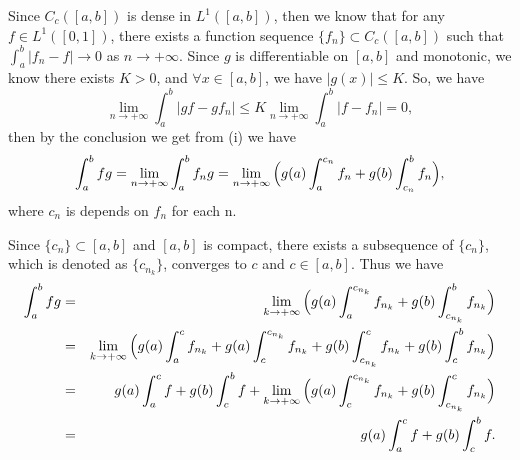 \documentclass[12pt,a4paper]{ctexart}
\begin{document}
Since $C_{c}([a, b])$ is dense in $L^{1}([a, b])$, then we know that for any $f \in L^{1}([0, 1])$, there exists a function sequence $\{f_{n}\} \subset C_{c}([a, b])$ such that $\int_{a}^{b} |f_{n} - f| \to 0$ as $n \to + \infty$.
Since $g$ is differentiable on $[a,b]$ and monotonic, we know there exists $K > 0$, and $\forall x \in [a, b]$, we have $|g(x)| \leq K$. So, we have
\begin{equation*}
   \lim_{n \to + \infty} \int_{a}^{b} |g f - g f_{n}| \leq K \lim_{n \to + \infty} \int_{a}^{b}|f - f_{n}| = 0,
\end{equation*}
then by the conclusion we get from (i) we have
\begin{equation*}
   \int_{a}^{b} f g = \lim_{n \to + \infty} \int_{a}^{b} f_{n} g = \lim_{n \to + \infty} \Big{(} g(a) \int_{a}^{c_{n}} f_{n} + g(b) \int_{c_{n}}^{b} f_{n} \Big{)},
\end{equation*}
where $c_{n}$ is depends on $f_{n}$ for each n.

Since $\{c_{n}\} \subset [a, b]$ and $[a, b]$ is compact, there exists a subsequence of $\{c_{n}\}$, which is denoted as $\{c_{n_{k}}\}$, converges to $c$ and $c \in [a, b]$. Thus we have
\begin{eqnarray*}
\int_{a}^{b} f g & = & \lim_{k \to + \infty} \Big{(} g(a) \int_{a}^{c_{n_{k}}} f_{n_{k}} + g(b) \int_{c_{n_{k}}}^{b} f_{n_{k}} \Big{)} \\
& = & \lim_{k \to + \infty} \Big{(} g(a) \int_{a}^{c} f_{n_{k}} + g(a) \int_{c}^{c_{n_{k}}} f_{n_{k}} + g(b) \int_{c_{n_{k}}}^{c} f_{n_{k}} + g(b) \int_{c}^{b} f_{n_{k}} \Big{)} \\
& = &  g(a) \int_{a}^{c} f + g(b) \int_{c}^{b} f + \lim_{k \to + \infty} \Big{(} g(a) \int_{c}^{c_{n_{k}}} f_{n_{k}} +  g(b) \int_{c_{n_{k}}}^{c} f_{n_{k}} \Big{)} \\
& = & g(a) \int_{a}^{c} f + g(b) \int_{c}^{b} f.
\end{eqnarray*}
\end{document}
